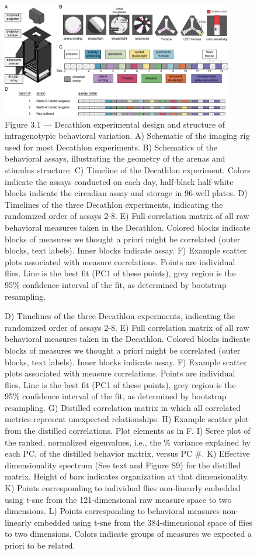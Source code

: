 \documentclass[12pt,letterpaper]{article}
\begin{document}
\begin{figure}[t!]
    \includegraphics[width=0.9\textwidth]{../figures/chapter_3/fig_3-1.pdf}
    \vspace{.1in}
    \caption*{Figure 3.1 — Decathlon experimental design and structure of intragenotypic behavioral variation. A) Schematic of the imaging rig used for most Decathlon experiments. B) Schematics of the behavioral assays, illustrating the geometry of the arenas and stimulus structure. C) Timeline of the Decathlon experiment. Colors indicate the assays conducted on each day, half-black half-white blocks indicate the circadian assay and storage in 96-well plates. D) Timelines of the three Decathlon experiments, indicating the randomized order of assays 2-8. E) Full correlation matrix of all raw behavioral measures taken in the Decathlon. Colored blocks indicate blocks of measures we thought a priori might be correlated (outer blocks, text labels). Inner blocks indicate assay. F) Example scatter plots associated with measure correlations. Points are individual flies. Line is the best fit (PC1 of these points), grey region is the 95\% confidence interval of the fit, as determined by bootstrap resampling.}
\end{figure}
\begin{figure}[t!]
    \caption{D) Timelines of the three Decathlon experiments, indicating the randomized order of assays 2-8. E) Full correlation matrix of all raw behavioral measures taken in the Decathlon. Colored blocks indicate blocks of measures we thought a priori might be correlated (outer blocks, text labels). Inner blocks indicate assay. F) Example scatter plots associated with measure correlations. Points are individual flies. Line is the best fit (PC1 of these points), grey region is the 95\% confidence interval of the fit, as determined by bootstrap resampling. G) Distilled correlation matrix in which all correlated metrics represent unexpected relationships. H) Example scatter plot from the distilled correlations. Plot elements as in F. I) Scree plot of the ranked, normalized eigenvalues, i.e., the \% variance explained by each PC, of the distilled behavior matrix, versus PC #. K) Effective dimensionality spectrum (See text and Figure S9) for the distilled matrix. Height of bars indicates organization at that dimensionality. K) Points corresponding to individual flies non-linearly embedded using t-sne from the 121-dimensional raw measure space to two dimensions. L) Points corresponding to behavioral measures non-linearly embedded using t-sne from the 384-dimensional space of flies to two dimensions. Colors indicate groups of measures we expected a priori to be related.}
\end{figure}
\end{document}
